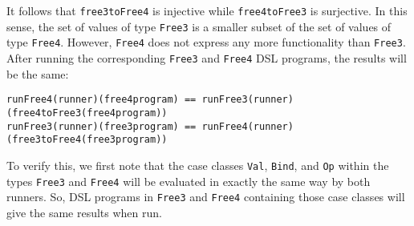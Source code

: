 It follows that \lstinline!free3toFree4!
is injective while \lstinline!free4toFree3!
is surjective. In this sense, the set of values of type \lstinline!Free3!
is a smaller subset of the set of values of type \lstinline!Free4!.
However, \lstinline!Free4!
does not express any more functionality than \lstinline!Free3!.
After running the corresponding \lstinline!Free3!
and \lstinline!Free4! DSL
programs, the results will be the same:
\begin{lstlisting}
runFree4(runner)(free4program) == runFree3(runner)(free4toFree3(free4program))
runFree3(runner)(free3program) == runFree4(runner)(free3toFree4(free3program))
\end{lstlisting}
To verify this, we first note that the case classes \lstinline!Val!,
\lstinline!Bind!, and \lstinline!Op!
within the types \lstinline!Free3!
and \lstinline!Free4! will
be evaluated in exactly the same way by both runners. So, DSL programs
in \lstinline!Free3! and
\lstinline!Free4! containing
those case classes will give the same results when run.

